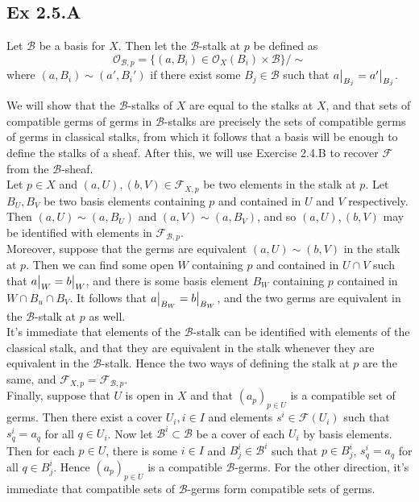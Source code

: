 \documentclass{article}
\newcommand\restr[2]{{%
  \left.\kern-\nulldelimiterspace %
  #1 %
  \vphantom{\big|} %
  \right|_{#2} %
  }}
\theoremstyle{definition}
\begin{document}
\subsection*{Ex 2.5.A}

Let $\mathcal{B}$ be a basis for $X$. Then let the $\mathcal{B}$-stalk at $p$
be defined as 
\[
	\mathcal{O}_{\mathcal{B}, p}
	=
	\{
		(a, B_i) \in
		\mathcal{O}_X(B_i) \times \mathcal{B}
	\}
	/ \sim
\] 
where $(a, B_i) \sim (a', B_i')$ if there exist some $B_j \in \mathcal{B}$ such
that $\restr{a}{B_j} = \restr{a'}{B_j}$. 

We will show that the $\mathcal{B}$-stalks of $X$ are equal to the stalks at
$X$, and that sets of compatible germs of germs in $\mathcal{B}$-stalks are
precisely the sets of compatible germs of germs in classical stalks, from which
it follows that a basis will be enough to define the stalks of a sheaf. After
this, we will use Exercise 2.4.B to recover $\mathcal{F}$ from the
$\mathcal{B}$-sheaf. \\

Let $p \in X$ and $(a, U), (b, V) \in \mathcal{F}_{X, p}$ be two elements in
the stalk at $p$. Let $B_U, B_V$ be two basis elements containing $p$ and
contained in $U$ and $V$ respectively. Then $(a, U) \sim (a, B_U)$ and $(a, V)
\sim (a, B_V)$, and so $(a, U), (b, V)$ may be identified with elements in
$\mathcal{F}_{\mathcal{B}, p}$. \\

Moreover, suppose that the germs are equivalent $(a, U) \sim (b, V)$ in the
stalk at $p$. Then we can find some open $W$ containing $p$ and contained in $U
\cap V$ such that $\restr{a}{W} = \restr{b}{W}$, and there is some basis
element $B_W$ containing $p$ contained in $W \cap B_u \cap B_V$. It follows
that $\restr{a}{B_W} = \restr{b}{B_W}$, and the two germs are equivalent in the
$\mathcal{B}$-stalk at $p$ as well. \\

It's immediate that elements of the $\mathcal{B}$-stalk can be identified with
elements of the classical stalk, and that they are equivalent in the stalk
whenever they are equivalent in the $\mathcal{B}$-stalk. Hence the two ways of
defining the stalk at $p$ are the same, and $\mathcal{F}_{X, p} =
\mathcal{F}_{\mathcal{B}, p}$. \\

Finally, suppose that $U$ is open in $X$ and that $(a_p)_{p \in U}$ is a
compatible set of germs. Then there exist a cover $U_i, i \in I$ and elements
$s^i \in \mathcal{F}(U_i)$ such that $s^i_q = a_q$ for all $q \in U_i$. Now let
$\mathcal{B}^{i} \subset \mathcal{B}$ be a cover of each $U_i$ by basis
elements. Then for each $p \in U$, there is some $i \in I$ and $B_{j}^{i} \in
\mathcal{B}^{i}$ such that $p \in B_j^{i}$, $s^i_{q} = a_q$ for all $q \in
B_j^{i}$. Hence $(a_p)_{p \in U}$ is a compatible $\mathcal{B}$-germs. For the
other direction, it's immediate that compatible sets of $\mathcal{B}$-germs
form compatible sets of germs. \\
\end{document}
